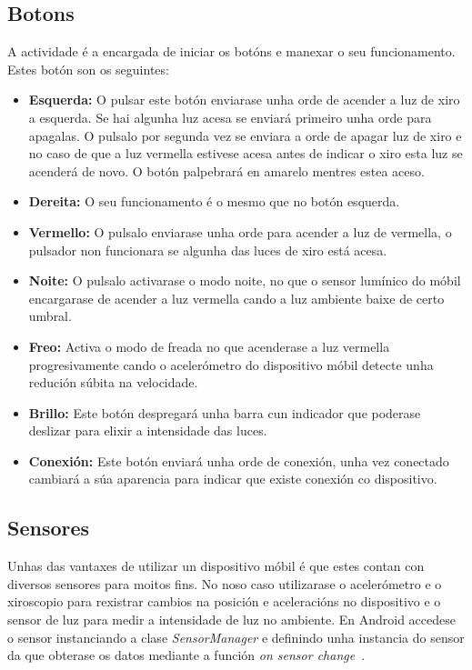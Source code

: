 \subsection{Botons}
A actividade é a encargada de iniciar os botóns e manexar o seu funcionamento. Estes botón son os seguintes:
\begin{itemize}
    \item \textbf{Esquerda:} O pulsar este botón enviarase unha orde de acender a luz de xiro a esquerda. Se hai algunha luz acesa se enviará primeiro unha orde para apagalas. O pulsalo por segunda vez se enviara a orde de apagar luz de xiro e no caso de que a luz vermella estivese acesa antes de indicar o xiro esta luz se acenderá de novo. O botón palpebrará en amarelo mentres estea aceso.
    \item \textbf{Dereita:} O seu funcionamento é o mesmo que no botón esquerda.
    \item \textbf{Vermello:} O pulsalo enviarase unha orde para acender a luz de vermella, o pulsador non funcionara se algunha das luces de xiro está acesa.
    \item \textbf{Noite:} O pulsalo activarase o modo noite, no que o sensor lumínico do móbil encargarase de acender a luz vermella cando a luz ambiente baixe de certo umbral.
    \item \textbf{Freo:} Activa o modo de freada no que acenderase a luz vermella progresivamente cando o acelerómetro do dispositivo móbil detecte unha redución súbita na velocidade.
    \item \textbf{Brillo:} Este botón despregará unha barra cun indicador que poderase deslizar para elixir a intensidade das luces.
    \item \textbf{Conexión:} Este botón enviará unha orde de conexión, unha vez conectado cambiará a súa aparencia para indicar que existe conexión co dispositivo.
\end{itemize}
\subsection{Sensores}
Unhas das vantaxes de utilizar un dispositivo móbil é que estes contan con diversos sensores para moitos fins. No noso caso utilizarase o acelerómetro e o xiroscopio para rexistrar cambios na posición e aceleracións no dispositivo e o sensor de luz para medir a intensidade de luz no ambiente.
En Android accedese o sensor instanciando a clase \emph{SensorManager} e definindo unha instancia do sensor da que obterase os datos mediante a función \emph{on sensor change}~\cite{Sensors}.

